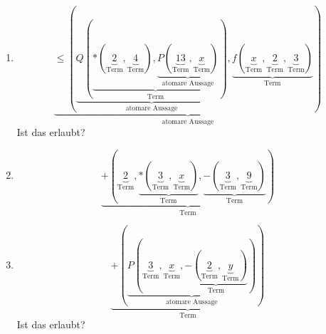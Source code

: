 \documentclass[a4paper]{article}
\begin{document}
\begin{enumerate}
\begin{enumerate}
			\item
			\begin{equation*}
				\underbrace{\leq(\underbrace{Q(\underbrace{*(\underbrace{2}_{\text{Term}}, \underbrace{4}_{\text{Term}}), \underbrace{P(\underbrace{13}_{\text{Term}}, \underbrace{x}_{\text{Term}})}_{\text{atomare Aussage}}}_{\text{Term}})}_{\text{atomare Aussage}}, \underbrace{f(\underbrace{x}_{\text{Term}}, \underbrace{2}_{\text{Term}}, \underbrace{3}_{\text{Term}})}_{\text{Term}})}_{\text{atomare Aussage}}
			\end{equation*}
			\newline
			Ist das erlaubt?
			
			\item
			\begin{equation*}
				\underbrace{+(\underbrace{2}_{\text{Term}}, \underbrace{*(\underbrace{3}_{\text{Term}}, \underbrace{x}_{\text{Term}})}_{\text{Term}}, \underbrace{-(\underbrace{3}_{\text{Term}}, \underbrace{9}_{\text{Term}})}_{\text{Term}})}_{\text{Term}}
			\end{equation*}
			
			\item
			\begin{equation*}
				\underbrace{+(\underbrace{P(\underbrace{3}_{\text{Term}}, \underbrace{x}_{\text{Term}}, \underbrace{-(\underbrace{2}_{\text{Term}}, \underbrace{y}_{\text{Term}})}_{\text{Term}})}_{\text{atomare Aussage}})}_{\text{Term}}
			\end{equation*}
			\newline
			Ist das erlaubt?
		\end{enumerate}
		

\end{enumerate}
\end{document}
